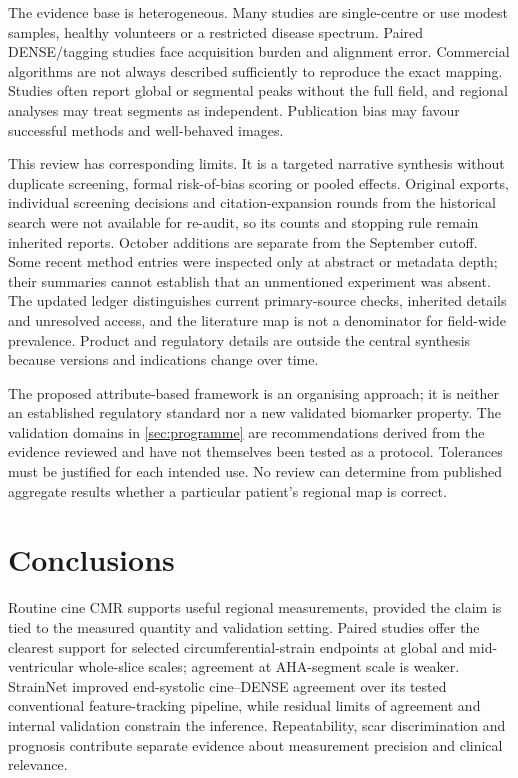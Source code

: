 The evidence base is heterogeneous. Many studies are single-centre or use modest samples, healthy volunteers or a restricted disease spectrum. Paired DENSE/tagging studies face acquisition burden and alignment error. Commercial algorithms are not always described sufficiently to reproduce the exact mapping. Studies often report global or segmental peaks without the full field, and regional analyses may treat segments as independent. Publication bias may favour successful methods and well-behaved images.

This review has corresponding limits. It is a targeted narrative synthesis without duplicate screening, formal risk-of-bias scoring or pooled effects. Original exports, individual screening decisions and citation-expansion rounds from the historical search were not available for re-audit, so its counts and stopping rule remain inherited reports. October additions are separate from the September cutoff. Some recent method entries were inspected only at abstract or metadata depth; their summaries cannot establish that an unmentioned experiment was absent. The updated ledger distinguishes current primary-source checks, inherited details and unresolved access, and the literature map is not a denominator for field-wide prevalence. Product and regulatory details are outside the central synthesis because versions and indications change over time.

The proposed attribute-based framework is an organising approach; it is neither an established regulatory standard nor a new validated biomarker property. The validation domains in \cref{sec:programme} are recommendations derived from the evidence reviewed and have not themselves been tested as a protocol. Tolerances must be justified for each intended use. No review can determine from published aggregate results whether a particular patient's regional map is correct.

\section{Conclusions}

Routine cine CMR supports useful regional measurements, provided the claim is tied to the measured quantity and validation setting. Paired studies offer the clearest support for selected circumferential-strain endpoints at global and mid-ventricular whole-slice scales; agreement at AHA-segment scale is weaker. StrainNet improved end-systolic cine--DENSE agreement over its tested conventional feature-tracking pipeline, while residual limits of agreement and internal validation constrain the inference. Repeatability, scar discrimination and prognosis contribute separate evidence about measurement precision and clinical relevance.

